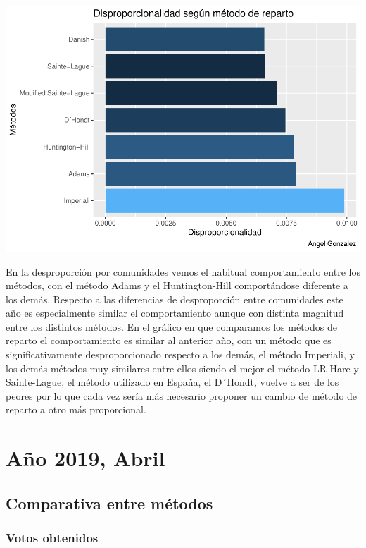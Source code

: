 \documentclass[12pt,a4paper,]{book}
\numberwithin{dummy}{section}
\theoremstyle{ocrenumbox}
\theoremstyle{blacknumex}
\theoremstyle{blacknumbox}
\theoremstyle{ocrenum}
\theoremstyle{ocrenum}
\begin{document}
\begin{center}\includegraphics[width=1\linewidth]{figurasR/unnamed-chunk-42-2} \end{center}

En la desproporción por comunidades vemos el habitual comportamiento
entre los métodos, con el método Adams y el Huntington-Hill
comportándose diferente a los demás. Respecto a las diferencias de
desproporción entre comunidades este año es especialmente similar el
comportamiento aunque con distinta magnitud entre los distintos métodos.
En el gráfico en que comparamos los métodos de reparto el comportamiento
es similar al anterior año, con un método que es significativamente
desproporcionado respecto a los demás, el método Imperiali, y los demás
métodos muy similares entre ellos siendo el mejor el método LR-Hare y
Sainte-Lague, el método utilizado en España, el D´Hondt, vuelve a ser de
los peores por lo que cada vez sería más necesario proponer un cambio de
método de reparto a otro más proporcional.

\hypertarget{auxf1o-2019-abril}{%
\section{Año 2019, Abril}\label{auxf1o-2019-abril}}

\hypertarget{comparativa-entre-muxe9todos-13}{%
\subsection{Comparativa entre
métodos}\label{comparativa-entre-muxe9todos-13}}

\hypertarget{votos-obtenidos-13}{%
\subsubsection{Votos obtenidos}\label{votos-obtenidos-13}}
\end{document}
